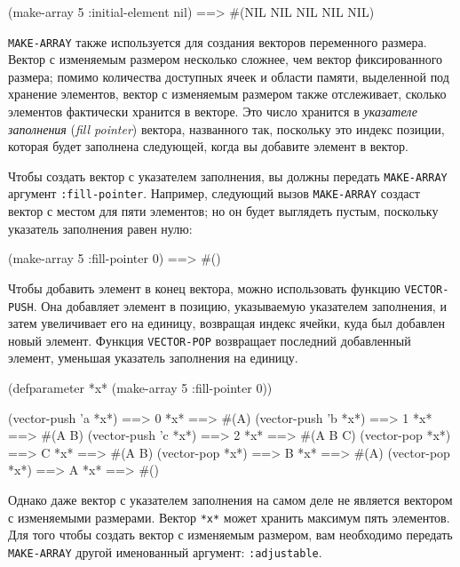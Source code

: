 \begin{myverb}
(make-array 5 :initial-element nil) ==> #(NIL NIL NIL NIL NIL)
\end{myverb}

\lstinline{MAKE-ARRAY} также используется для создания векторов переменного размера.
Вектор с изменяемым размером несколько сложнее, чем вектор фиксированного размера;
помимо количества доступных ячеек и области памяти, выделенной под хранение элементов,
вектор с изменяемым размером также отслеживает, сколько элементов фактически
хранится в векторе.  Это число хранится в \textit{указателе заполнения} (\textit{fill pointer})
вектора, названного так, поскольку это индекс позиции, которая будет заполнена следующей,
когда вы добавите элемент в вектор.

Чтобы создать вектор с указателем заполнения, вы должны передать \lstinline{MAKE-ARRAY}
аргумент \lstinline{:fill-pointer}.  Например, следующий вызов \lstinline{MAKE-ARRAY} создаст вектор
с местом для пяти элементов; но он будет выглядеть пустым, поскольку указатель заполнения
равен нулю:

\begin{myverb}
(make-array 5 :fill-pointer 0) ==> #()
\end{myverb}

Чтобы добавить элемент в конец вектора, можно использовать функцию
\lstinline{VECTOR-PUSH}.  Она добавляет элемент в позицию, указываемую указателем заполнения, и
затем увеличивает его на единицу, возвращая индекс ячейки, куда был добавлен новый
элемент.  Функция \lstinline{VECTOR-POP} возвращает последний добавленный элемент, уменьшая
указатель заполнения на единицу.

\begin{myverb}
(defparameter *x* (make-array 5 :fill-pointer 0))

(vector-push 'a *x*) ==> 0
*x*                  ==> #(A)
(vector-push 'b *x*) ==> 1
*x*                  ==> #(A B)
(vector-push 'c *x*) ==> 2
*x*                  ==> #(A B C)
(vector-pop *x*)     ==> C
*x*                  ==> #(A B)
(vector-pop *x*)     ==> B
*x*                  ==> #(A)
(vector-pop *x*)     ==> A
*x*                  ==> #()
\end{myverb}

Однако даже вектор с указателем заполнения на самом деле не является вектором с изменяемыми
размерами.  Вектор \lstinline{*x*} может хранить максимум пять элементов.  Для того чтобы
создать вектор с изменяемым размером, вам необходимо передать \lstinline{MAKE-ARRAY} другой
именованный аргумент: \lstinline{:adjustable}.

